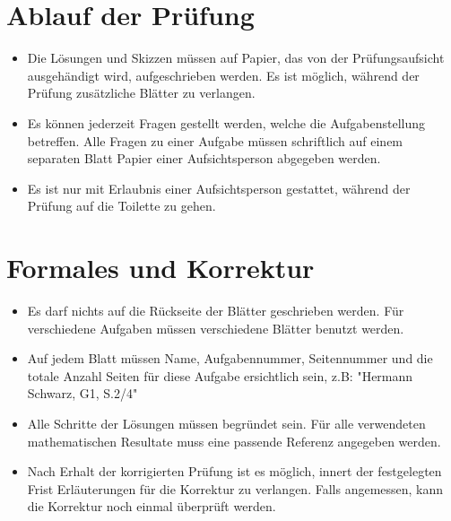 \documentclass[12pt,a4paper]{article}
\begin{document}
\section{Ablauf der Prüfung}
\begin{itemize}

\item Die Lösungen und Skizzen müssen auf Papier, das von der Prüfungsaufsicht ausgehändigt wird, aufgeschrieben werden. Es ist möglich, während der Prüfung zusätzliche Blätter zu verlangen.

\item Es können jederzeit Fragen gestellt werden, welche die Aufgabenstellung betreffen. Alle Fragen zu einer Aufgabe müssen schriftlich auf einem separaten Blatt Papier einer Aufsichtsperson abgegeben werden.

\item Es ist nur mit Erlaubnis einer Aufsichtsperson gestattet, während der Prüfung auf die Toilette zu gehen.

\end{itemize}

\section{Formales und Korrektur}
\begin{itemize}
\item Es darf nichts auf die Rückseite der Blätter geschrieben werden. Für verschiedene Aufgaben müssen verschiedene Blätter benutzt werden.
\item Auf jedem Blatt müssen Name, Aufgabennummer, Seitennummer und die totale Anzahl Seiten für diese Aufgabe ersichtlich sein, z.B: "Hermann Schwarz, G1, S.2/4"
\item Alle Schritte der Lösungen müssen begründet sein. Für alle verwendeten mathematischen Resultate muss eine passende Referenz angegeben werden.
\item Nach Erhalt der korrigierten Prüfung ist es möglich, innert der festgelegten Frist Erläuterungen für die Korrektur zu verlangen. Falls angemessen, kann die Korrektur noch einmal überprüft werden.
\end{itemize}
\end{document}
